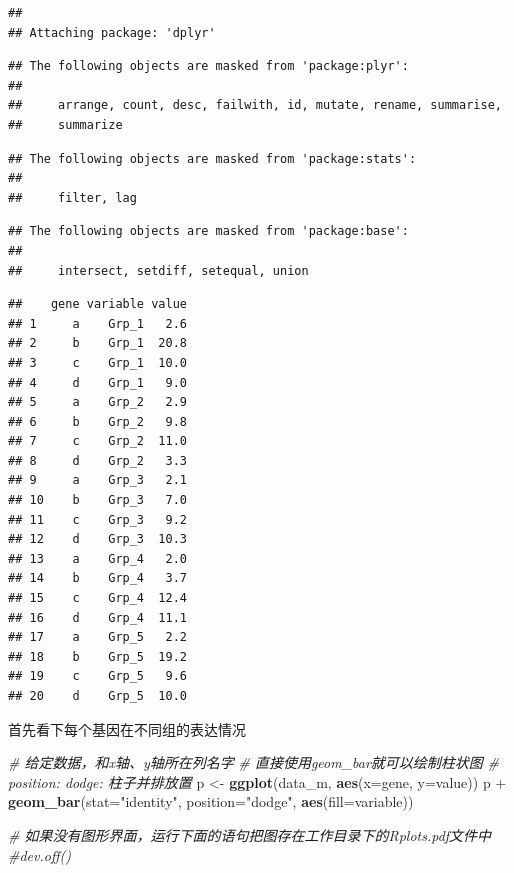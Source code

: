 \documentclass[]{article}
\newenvironment{Shaded}{\begin{snugshade}}{\end{snugshade}}
\newcommand{\KeywordTok}[1]{\textcolor[rgb]{0.13,0.29,0.53}{\textbf{{#1}}}}
\newcommand{\DataTypeTok}[1]{\textcolor[rgb]{0.13,0.29,0.53}{{#1}}}
\newcommand{\StringTok}[1]{\textcolor[rgb]{0.31,0.60,0.02}{{#1}}}
\newcommand{\CommentTok}[1]{\textcolor[rgb]{0.56,0.35,0.01}{\textit{{#1}}}}
\newcommand{\NormalTok}[1]{{#1}}
\numberwithin{figure}{section}
\numberwithin{table}{section}
\theoremstyle{definition}
\theoremstyle{definition}
\theoremstyle{definition}
\theoremstyle{remark}
\begin{document}
\begin{verbatim}
## 
## Attaching package: 'dplyr'
\end{verbatim}

\begin{verbatim}
## The following objects are masked from 'package:plyr':
## 
##     arrange, count, desc, failwith, id, mutate, rename, summarise,
##     summarize
\end{verbatim}

\begin{verbatim}
## The following objects are masked from 'package:stats':
## 
##     filter, lag
\end{verbatim}

\begin{verbatim}
## The following objects are masked from 'package:base':
## 
##     intersect, setdiff, setequal, union
\end{verbatim}

\begin{Shaded}
\end{Shaded}

\begin{verbatim}
##    gene variable value
## 1     a    Grp_1   2.6
## 2     b    Grp_1  20.8
## 3     c    Grp_1  10.0
## 4     d    Grp_1   9.0
## 5     a    Grp_2   2.9
## 6     b    Grp_2   9.8
## 7     c    Grp_2  11.0
## 8     d    Grp_2   3.3
## 9     a    Grp_3   2.1
## 10    b    Grp_3   7.0
## 11    c    Grp_3   9.2
## 12    d    Grp_3  10.3
## 13    a    Grp_4   2.0
## 14    b    Grp_4   3.7
## 15    c    Grp_4  12.4
## 16    d    Grp_4  11.1
## 17    a    Grp_5   2.2
## 18    b    Grp_5  19.2
## 19    c    Grp_5   9.6
## 20    d    Grp_5  10.0
\end{verbatim}

首先看下每个基因在不同组的表达情况

\begin{Shaded}
\begin{Highlighting}[]
\CommentTok{# 给定数据，和x轴、y轴所在列名字}
\CommentTok{# 直接使用geom_bar就可以绘制柱状图}
\CommentTok{# position: dodge: 柱子并排放置}
\NormalTok{p <-}\StringTok{ }\KeywordTok{ggplot}\NormalTok{(data_m, }\KeywordTok{aes}\NormalTok{(}\DataTypeTok{x=}\NormalTok{gene, }\DataTypeTok{y=}\NormalTok{value))}
\NormalTok{p +}\StringTok{ }\KeywordTok{geom_bar}\NormalTok{(}\DataTypeTok{stat=}\StringTok{"identity"}\NormalTok{, }\DataTypeTok{position=}\StringTok{"dodge"}\NormalTok{, }\KeywordTok{aes}\NormalTok{(}\DataTypeTok{fill=}\NormalTok{variable))}

\CommentTok{# 如果没有图形界面，运行下面的语句把图存在工作目录下的Rplots.pdf文件中}
\CommentTok{#dev.off()}
\end{Highlighting}
\end{Shaded}
\end{document}
